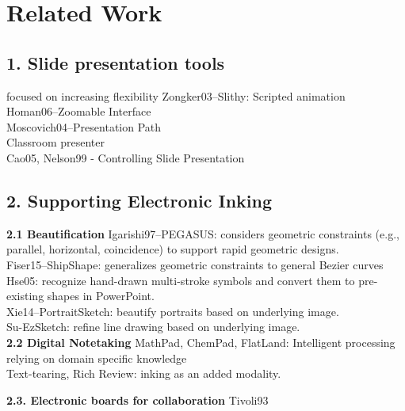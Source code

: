 \section{Related Work}
\subsection{1. Slide presentation tools}
focused on increasing flexibility
Zongker03--Slithy: Scripted animation\\
Homan06--Zoomable Interface\\
Moscovich04--Presentation Path\\
Classroom presenter\\
Cao05, Nelson99 - Controlling Slide Presentation

\subsection{2. Supporting Electronic Inking}

\textbf{2.1 Beautification}
Igarishi97--PEGASUS: considers geometric constraints (e.g., parallel, horizontal, coincidence) to support rapid geometric designs.\\
Fiser15--ShipShape: generalizes geometric constraints to general Bezier curves\\
Hse05: recognize hand-drawn multi-stroke symbols and convert them to pre-existing shapes in PowerPoint.\\
Xie14--PortraitSketch: beautify portraits based on underlying image.\\
Su-EzSketch: refine line drawing based on underlying image.\\
 
\textbf{2.2 Digital Notetaking}
MathPad, ChemPad, FlatLand: Intelligent processing relying on domain specific knowledge\\
Text-tearing, Rich Review: inking as an added modality.

\textbf{2.3. Electronic boards for collaboration}
Tivoli93

